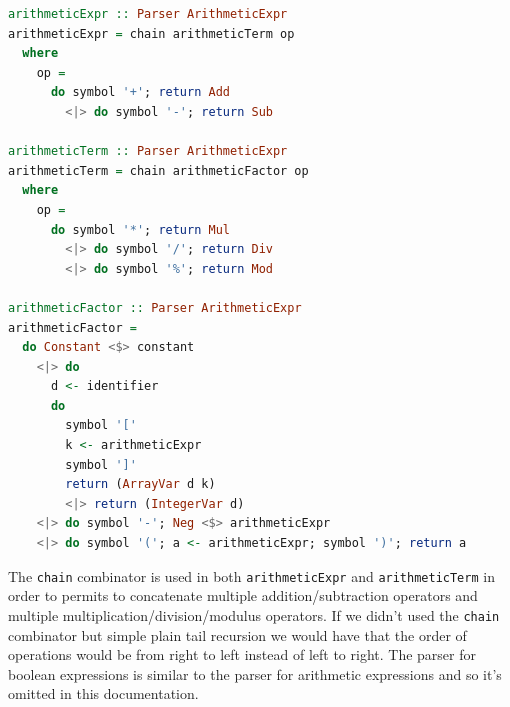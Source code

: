 \documentclass[12pt,a4paper]{article}
\begin{document}
\begin{lstlisting}[language=Haskell, style=custom-style]
arithmeticExpr :: Parser ArithmeticExpr
arithmeticExpr = chain arithmeticTerm op
  where
    op =
      do symbol '+'; return Add
        <|> do symbol '-'; return Sub

arithmeticTerm :: Parser ArithmeticExpr
arithmeticTerm = chain arithmeticFactor op
  where
    op =
      do symbol '*'; return Mul
        <|> do symbol '/'; return Div
        <|> do symbol '%'; return Mod

arithmeticFactor :: Parser ArithmeticExpr
arithmeticFactor =
  do Constant <$> constant
    <|> do
      d <- identifier
      do
        symbol '['
        k <- arithmeticExpr
        symbol ']'
        return (ArrayVar d k)
        <|> return (IntegerVar d)
    <|> do symbol '-'; Neg <$> arithmeticExpr
    <|> do symbol '('; a <- arithmeticExpr; symbol ')'; return a
\end{lstlisting}
The \texttt{chain} combinator is used in both \texttt{arithmeticExpr} and \texttt{arithmeticTerm} in order to permits to concatenate multiple addition/subtraction operators and multiple multiplication/division/modulus operators.
If we didn't used the \texttt{chain} combinator but simple plain tail recursion we would have that the order of operations would be from right to left instead of left to right.
The parser for boolean expressions is similar to the parser for arithmetic expressions and so it's omitted in this documentation.
\end{document}
